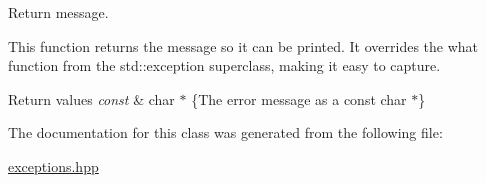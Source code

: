 Return message. 

This function returns the message so it can be printed. It overrides the what function from the std\+::exception superclass, making it easy to capture.


\begin{DoxyRetVals}{Return values}
{\em const} & char $\ast$ \{The error message as a const char $\ast$\} \\
\hline
\end{DoxyRetVals}


The documentation for this class was generated from the following file\+:\begin{DoxyCompactItemize}
\item 
\hyperlink{exceptions_8hpp}{exceptions.\+hpp}\end{DoxyCompactItemize}
